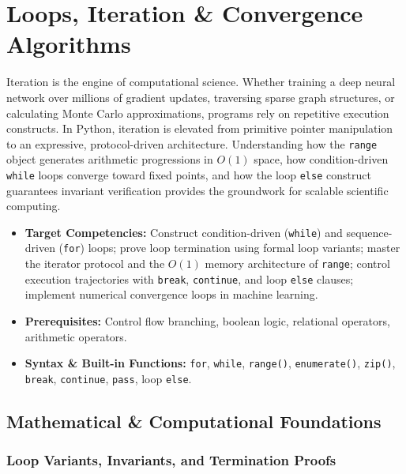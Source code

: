 \chapter{Loops, Iteration \& Convergence Algorithms}

Iteration is the engine of computational science. Whether training a deep neural network over millions of gradient updates, traversing sparse graph structures, or calculating Monte Carlo approximations, programs rely on repetitive execution constructs. In Python, iteration is elevated from primitive pointer manipulation to an expressive, protocol-driven architecture. Understanding how the \texttt{range} object generates arithmetic progressions in $O(1)$ space, how condition-driven \texttt{while} loops converge toward fixed points, and how the loop \texttt{else} construct guarantees invariant verification provides the groundwork for scalable scientific computing.

\vspace{0.5cm}
\begin{tcolorbox}[colback=primarylight, colframe=primarydark, title={\textbf{Executive Roadmap \& Learning Objectives}}]
\begin{itemize}
    \item \textbf{Target Competencies:} Construct condition-driven (\texttt{while}) and sequence-driven (\texttt{for}) loops; prove loop termination using formal loop variants; master the iterator protocol and the $O(1)$ memory architecture of \texttt{range}; control execution trajectories with \texttt{break}, \texttt{continue}, and loop \texttt{else} clauses; implement numerical convergence loops in machine learning.
    \item \textbf{Prerequisites:} Control flow branching, boolean logic, relational operators, arithmetic operators.
    \item \textbf{Syntax \& Built-in Functions:} \texttt{for}, \texttt{while}, \texttt{range()}, \texttt{enumerate()}, \texttt{zip()}, \texttt{break}, \texttt{continue}, \texttt{pass}, loop \texttt{else}.
\end{itemize}
\end{tcolorbox}

\section{Mathematical \& Computational Foundations}

\subsection{Loop Variants, Invariants, and Termination Proofs}

